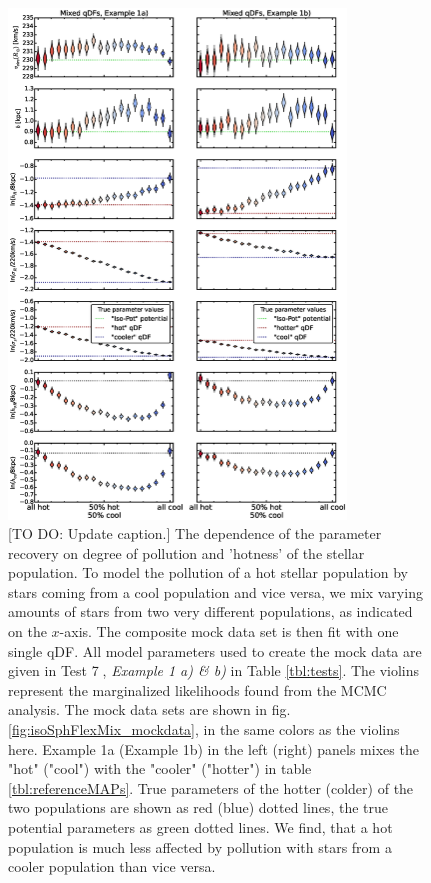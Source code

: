 \begin{figure}
\includegraphics[width=0.8\textwidth]{figs/isoSphFlexMixCont_violins.eps}
\caption{[TO DO: Update caption.] The dependence of the parameter recovery on degree of pollution and 'hotness' of the stellar population. To model the pollution of a hot stellar population by stars coming from a cool population and vice versa, we mix varying amounts of stars from two very different populations, as indicated on the $x$-axis. The composite mock data set is then fit with one single qDF. All model parameters used to create the mock data are given in Test \textcircled{7}, \emph{Example 1 a) \& b)} in Table \ref{tbl:tests}. The violins represent the marginalized likelihoods found from the MCMC analysis. The mock data sets are shown in fig. \ref{fig:isoSphFlexMix_mockdata}, in the same colors as the violins here. Example 1a (Example 1b) in the left (right) panels mixes the "hot" ("cool") \MAP with the "cooler" ("hotter") \MAP in table \ref{tbl:referenceMAPs}. True parameters of the hotter (colder) of the two populations are shown as red (blue) dotted lines, the true potential parameters as green dotted lines. We find, that a hot population is much less affected by pollution with stars from a cooler population than vice versa.}
\label{fig:isoSphFlexMixCont}
\end{figure}

